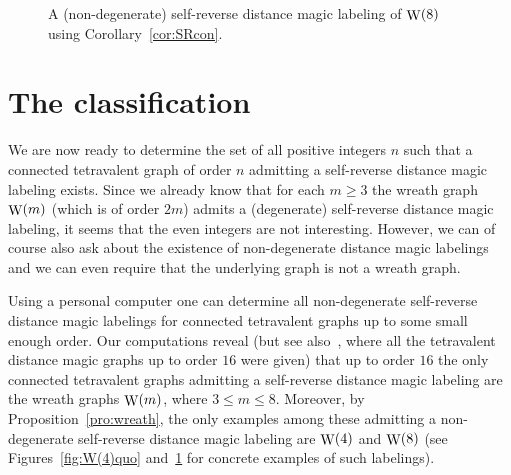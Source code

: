 \documentclass[11 pt,english]{article}
\newcommand{\Wr}{\mathop{\rm W}}
\theoremstyle{definition}
\begin{document}
\begin{figure}[htbp]
\begin{center}
{\begin{tikzpicture}[scale = .4]
\end{tikzpicture}
}
\caption{A (non-degenerate) self-reverse distance magic labeling of $\Wr(8)$ using Corollary~\ref{cor:SRcon}.}
\label{fig:SR16}
\end{center}
\end{figure} 
 
 
 
 
\section{The classification}
\label{sec:classification}

We are now ready to determine the set of all positive integers $n$ such that a connected tetravalent graph of order $n$ admitting a self-reverse distance magic labeling exists. Since we already know that for each $m \geq 3$ the wreath graph $\Wr(m)$ (which is of order $2m$) admits a (degenerate) self-reverse distance magic labeling, it seems that the even integers are not interesting. However, we can of course also ask about the existence of non-degenerate distance magic labelings and we can even require that the underlying graph is not a wreath graph.

Using a personal computer one can determine all non-degenerate self-reverse distance magic labelings for connected tetravalent graphs up to some small enough order. Our computations reveal (but see also~\cite{RozSpa25}, where all the tetravalent distance magic graphs up to order $16$ were given) that up to order $16$ the only connected tetravalent graphs admitting a self-reverse distance magic labeling are the wreath graphs $\Wr(m)$, where $3 \leq m \leq 8$. Moreover, by Proposition~\ref{pro:wreath}, the only examples among these admitting a non-degenerate self-reverse distance magic labeling are $\Wr(4)$ and $\Wr(8)$ (see Figures~\ref{fig:W(4)quo} and~\ref{fig:SR16} for concrete examples of such labelings).
\end{document}
